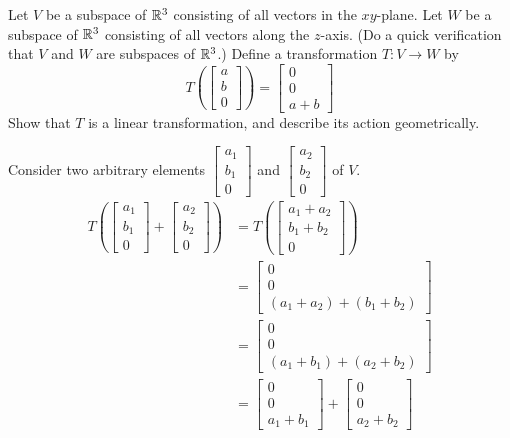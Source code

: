 \documentclass{ximera}
\begin{document}
\begin{example}
Let $V$ be a subspace of $\mathbb{R}^3$ consisting of all vectors in the $xy$-plane.  Let $W$ be a subspace of $\mathbb{R}^3$ consisting of all vectors along the $z$-axis.  (Do a quick verification that $V$ and $W$ are subspaces of $\mathbb{R}^3$.)  Define a transformation $T:V\rightarrow W$ by 
$$T\left(\begin{bmatrix}a\\b\\0\end{bmatrix}\right)=\begin{bmatrix}0\\0\\a+b\end{bmatrix}$$
Show that $T$ is a linear transformation, and describe its action geometrically.
\begin{explanation}
Consider two arbitrary elements $\begin{bmatrix}a_1\\b_1\\0\end{bmatrix}$ and $\begin{bmatrix}a_2\\b_2\\0\end{bmatrix}$ of $V$.
\begin{align*}
T\left(\begin{bmatrix}a_1\\b_1\\0\end{bmatrix}+ \begin{bmatrix}a_2\\b_2\\0\end{bmatrix}\right)&=T\left(\begin{bmatrix}a_1+a_2\\b_1+b_2\\0\end{bmatrix}\right)\\
&=\begin{bmatrix}0\\0\\(a_1+a_2)+(b_1+b_2)\end{bmatrix}\\
&=\begin{bmatrix}0\\0\\(a_1+b_1)+(a_2+b_2)\end{bmatrix}\\
&=\begin{bmatrix}0\\0\\a_1+b_1\end{bmatrix}+\begin{bmatrix}0\\0\\a_2+b_2\end{bmatrix}\\

\end{align*}
\end{explanation}
\end{example}
\end{document}
